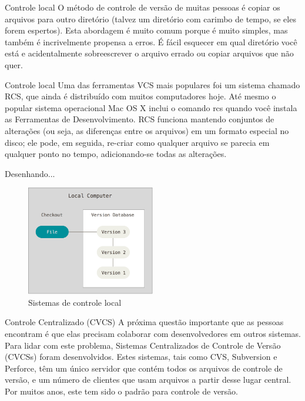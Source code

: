 \documentclass{beamer}
\begin{document}
\begin{frame}{Controle local}\justifying
      O método de controle de versão de muitas pessoas é copiar os arquivos para outro diretório (talvez um diretório com carimbo de tempo, se eles forem espertos). Esta abordagem é muito comum porque é muito simples, mas também é incrivelmente propensa a erros. É fácil esquecer em qual diretório você está e acidentalmente sobreescrever o arquivo errado ou copiar arquivos que não quer.
\end{frame}

\begin{frame}{Controle local} \justifying
      Uma das ferramentas VCS mais populares foi um sistema chamado RCS, que ainda é distribuído com muitos computadores hoje. Até mesmo o popular sistema operacional Mac OS X inclui o comando rcs quando você instala as Ferramentas de Desenvolvimento. RCS funciona mantendo conjuntos de alterações (ou seja, as diferenças entre os arquivos) em um formato especial no disco; ele pode, em seguida, re-criar como qualquer arquivo se parecia em qualquer ponto no tempo, adicionando-se todas as alterações.
\end{frame}

\begin{frame}[fragile]{Desenhando...}
      \begin{figure}[H]
            \centerline{\includegraphics[width=0.5\textwidth]{assets/aula-tdsi-ifds-2023-05-24/controle-local.png}}
            \caption{Sistemas de controle local}
        \end{figure}
\end{frame}

\begin{frame}{Controle Centralizado (CVCS)} \justifying
      A próxima questão importante que as pessoas encontram é que elas precisam colaborar com desenvolvedores em outros sistemas. Para lidar com este problema, Sistemas Centralizados de Controle de Versão (CVCSs) foram desenvolvidos. Estes sistemas, tais como CVS, Subversion e Perforce, têm um único servidor que contém todos os arquivos de controle de versão, e um número de clientes que usam arquivos a partir desse lugar central. Por muitos anos, este tem sido o padrão para controle de versão.
\end{frame}
\end{document}
